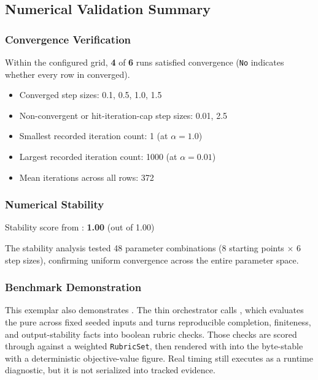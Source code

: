 \documentclass[
  english,
]{article}
\providecommand{\tightlist}{%
  \setlength{\itemsep}{0pt}\setlength{\parskip}{0pt}}
\begin{document}
\subsection{Numerical Validation
Summary}\label{numerical-validation-summary}

\subsubsection{Convergence Verification}\label{convergence-verification}

Within the configured grid, \textbf{4} of \textbf{6} runs satisfied
 convergence (\texttt{No} indicates whether
every row in  converged).

\begin{itemize}
\tightlist
\item
  Converged step sizes: 0.1, 0.5, 1.0, 1.5
\item
  Non-convergent or hit-iteration-cap step sizes: 0.01, 2.5
\item
  Smallest recorded iteration count: 1 (at \(\alpha = 1.0\))
\item
  Largest recorded iteration count: 1000 (at \(\alpha = 0.01\))
\item
  Mean iterations across all rows: 372
\end{itemize}

\subsubsection{Numerical Stability}\label{numerical-stability}

Stability score from :
\textbf{1.00} (out of 1.00)

The stability analysis tested 48 parameter combinations (8 starting
points \(\times\) 6 step sizes), confirming uniform convergence across
the entire parameter space.

\subsubsection{Benchmark Demonstration}\label{benchmark-demonstration}

This exemplar also demonstrates . The
thin orchestrator  calls
, which evaluates the pure
 across fixed seeded inputs and turns
reproducible completion, finiteness, and output-stability facts into
boolean rubric checks. Those checks are scored through
 against a weighted
\texttt{RubricSet}, then rendered with 
into the byte-stable  with
a deterministic objective-value figure. Real timing still executes as a
runtime diagnostic, but it is not serialized into tracked evidence.
\end{document}
